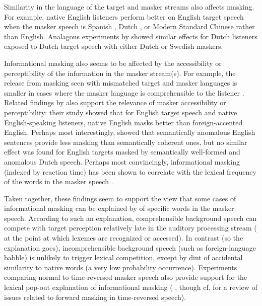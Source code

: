 
Similarity in the language of the target and masker streams also affects masking.  For example, native English listeners perform better on English target speech when the masker speech is Spanish \citep{GarciaLecumberriCooke2006}, Dutch \citep{BrouwerEtAl2012}, or Modern Standard Chinese \citep{VanEngenBradlow2007} rather than English.  Analagous experiments by \citet{RhebergenEtAl2005} showed similar effects for Dutch listeners exposed to Dutch target speech with either Dutch or Swedish maskers.  

Informational masking also seems to be affected by the accessibility or perceptibility of the information in the masker stream(s).  For example, the release from masking seen with mismatched target and masker languages is smaller in cases where the masker language is comprehensible to the listener \citep{VanEngen2010}.  Related findings by \citet{CalandruccioEtAl2010} also support the relevance of masker accessibility or perceptibility: their study showed that for English target speech and native English-speaking listeners, native English masks better than foreign-accented English.\footnotemark{}  Perhaps most interestingly, \citet{BrouwerEtAl2012} showed that semantically anomalous English sentences provide less masking than semantically coherent ones, but no similar effect was found for English targets masked by semantically well-formed and anomalous Dutch speech.  Perhaps most convincingly, informational masking (indexed by reaction time) has been shown to correlate with the lexical frequency of the words in the masker speech \citep{BoulengerEtAl2010}.


Taken together, these findings seem to support the view that some cases of informational masking can be explained by  of specific words in the masker speech.  According to such an explanation, comprehensible background speech can compete with target perception relatively late in the auditory processing stream (\ie{} at the point at which lexemes are recognized or accessed).  In contrast (so the explanation goes), incomprehensible background speech (such as foreign-language babble) is unlikely to trigger lexical competition, except by dint of accidental similarity to native words (a very low probability occurrence).  Experiments comparing normal to time-reversed masker speech also provide support for the lexical pop-out explanation of informational masking (\eg{} \citealt{HoenEtAl2007}, though cf. \citealt{RhebergenEtAl2005} for a review of issues related to forward masking in time-reversed speech).

